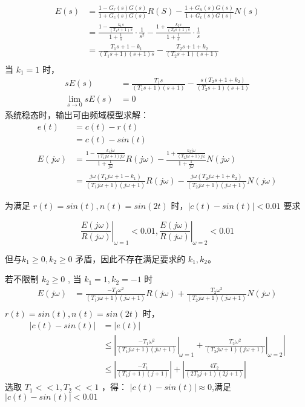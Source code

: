 {{		\begin{align*}
		E(s)&=\frac{1-G_r(s)G(s)}{1+G_c(s)G(s)}R(S)-\frac{1+G_n(s)G(s)}{1+G_c(s)G(s)}N(s)\\
		&=\frac{1-\frac{k_1s}{(T_1s+1)s}}{1+\frac{1}{s}}\cdot\frac{1}{s^2}-\frac{1+\frac{k_2s}{(T_2s+1)s}}{1+\frac{1}{s}}\cdot\frac{1}{s}\\
		&=\frac{T_1s+1-k_1}{(T_1s+1)(s+1)s}-\frac{T_2s+1+k_2}{(T_2s+1)(s+1)}\\
		\end{align*}
		当 $k_1=1$ 时，
		\begin{align*}
		sE(s)&=\frac{T_1s}{(T_1s+1)(s+1)}-\frac{s(T_2s+1+k_2)}{(T_2s+1)(s+1)}\\
		\lim_{s\to 0}sE(s)&=0
		\end{align*}
		系统稳态时，输出可由频域模型求解：
		\begin{align*}
		e(t)&=c(t)-r(t)\\
		&=c(t)-sin(t)\\
		E(j\omega)&=\frac{1-\frac{k_1j\omega}{(T_1j\omega+1)j\omega}}{1+\frac{1}{j\omega}}R(j\omega)-\frac{1+\frac{k_2j\omega}{(T_2j\omega+1)j\omega}}{1+\frac{1}{j\omega}} N(j\omega)\\
		&=\frac{j\omega(T_1j\omega+1-k_1)}{(T_1j\omega+1)(j\omega+1)}R(j\omega)-\frac{j\omega(T_2j\omega+1+k_2)}{(T_2j\omega+1)(j\omega+1)}N(j\omega)
		\end{align*}
		
		
		为满足 $r(t)=sin(t),n(t)=sin(2t)$ 时，$ |c(t)-sin(t)|<0.01$ 要求
		
		 $$\left.\frac{E(j\omega)}{R(j\omega)}\right|_{\omega=1}<0.01,\left.\frac{E(j\omega)}{R(j\omega)}\right|_{\omega=2}<0.01$$
		
		但与$k_1\geq 0, k_2\geq 0$ 矛盾，因此不存在满足要求的 $k_1,k_2$。
		
		
		若不限制 $k_2\geq 0$ , 当 $k_1=1,k_2=-1$ 时
		\begin{align*}
		E(j\omega)&=\frac{-T_1\omega^2}{(T_1j\omega+1)(j\omega+1)}R(j\omega)+\frac{T_2\omega^2}{(T_2j\omega+1)(j\omega+1)}N(j\omega)\\
		\end{align*}
		$r(t)=sin(t),n(t)=sin(2t)$ 时，
		\begin{align*}
		|c(t)-sin(t)|&=|e(t)|\\
		&\leq \left|\left.\frac{-T_1\omega^2}{(T_1j\omega+1)(j\omega+1)}\right|_{\omega=1}+\left.\frac{T_2\omega^2}{(T_2j\omega+1)(j\omega+1)}\right|_{\omega=2}\right| \\
		&\leq \left|\frac{-T_1}{(T_1j+1)(j+1)}\right|+\left|\frac{4T_2}{(2T_2j+1)(2j+1)}\right|
		\end{align*}
		选取 $T_1<<1,T_2<<1$ ，得： $|c(t)-sin(t)|\approx 0$,满足 $|c(t)-sin(t)|<0.01$
		
	}
}


